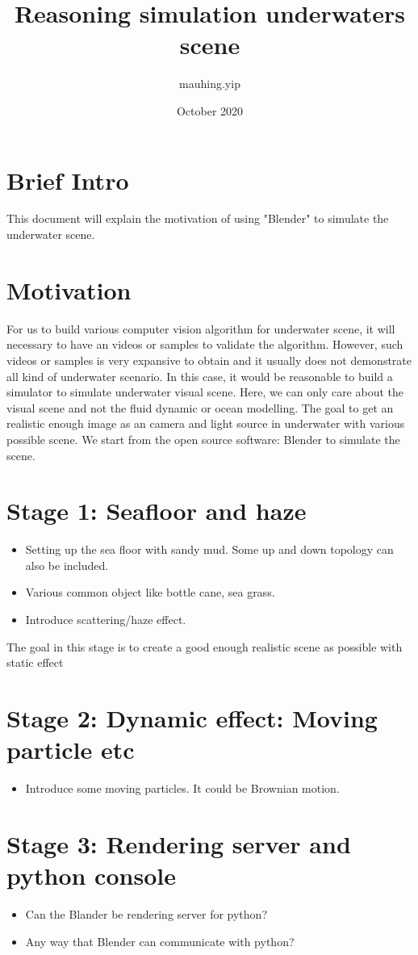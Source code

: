 \documentclass{article}
\title{Reasoning simulation underwaters scene}
\author{mauhing.yip }
\date{October 2020}
\begin{document}
\maketitle

\section{Brief Intro}
This document will explain the motivation of using "Blender" to simulate the underwater scene.

\section{Motivation}
For us to build various computer vision algorithm for underwater scene, it will necessary to have an videos or samples to validate the algorithm. However, such videos or samples is very expansive to obtain and it usually does not demonstrate all kind of underwater scenario. In this case, it would be reasonable to build a simulator to simulate underwater visual scene. Here, we can only care about the visual scene and not the fluid dynamic or ocean modelling. The goal to get an realistic enough image as an camera and light source in underwater with various possible scene. We start from the open source software: Blender to simulate the scene.


\section{Stage 1: Seafloor and haze}
\begin{itemize}
    \item Setting up the sea floor with sandy mud. Some up and down topology can also be included.
    \item Various common object like bottle cane, sea grass.
    \item Introduce scattering/haze effect.
\end{itemize}
The goal in this stage is to create a good enough realistic scene as possible with static effect

\section{Stage 2: Dynamic effect: Moving particle etc}
\begin{itemize}
    \item Introduce some moving particles. It could be Brownian motion.
\end{itemize}

\section{Stage 3: Rendering server and python console}
\begin{itemize}
    \item Can the Blander be rendering server for python?
    \item Any way that Blender can communicate with python?
\end{itemize}


%
%
\end{document}

